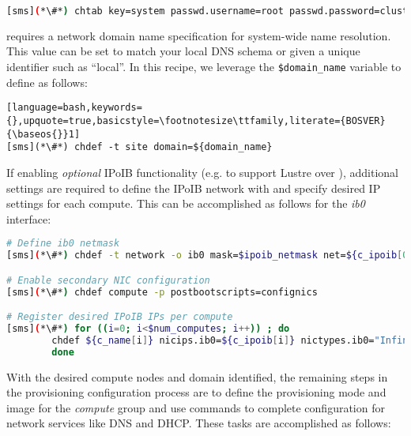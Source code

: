 \begin{lstlisting}[language=bash,keywords={},upquote=true,basicstyle=\footnotesize\ttfamily,]
[sms](*\#*) chtab key=system passwd.username=root passwd.password=cluster
\end{lstlisting}
\noindent \xCAT{} requires a network domain name specification for system-wide name
resolution. This value can be set to match your local DNS schema or given a
unique identifier such as ``local''. In this recipe, we leverage the
\texttt{\$domain\_name} variable to define as follows:

\begin{lstlisting}[language=bash,keywords={},upquote=true,basicstyle=\footnotesize\ttfamily,literate={BOSVER}{\baseos{}}1]
[sms](*\#*) chdef -t site domain=${domain_name}
\end{lstlisting}

If enabling {\em optional} IPoIB functionality (e.g. to support Lustre over \InfiniBand{}), additional
settings are required to define the IPoIB network with \xCAT{} and specify
desired IP settings for each compute. This can be accomplished as follows for
the {\em ib0} interface:

\begin{lstlisting}[language=bash,keywords={},upquote=true,basicstyle=\footnotesize\ttfamily]
# Define ib0 netmask
[sms](*\#*) chdef -t network -o ib0 mask=$ipoib_netmask net=${c_ipoib[0]}

# Enable secondary NIC configuration
[sms](*\#*) chdef compute -p postbootscripts=confignics

# Register desired IPoIB IPs per compute
[sms](*\#*) for ((i=0; i<$num_computes; i++)) ; do
		chdef ${c_name[i]} nicips.ib0=${c_ipoib[i]} nictypes.ib0="InfiniBand" nicnetworks.ib0=ib0
        done
\end{lstlisting}

With the desired compute nodes and domain identified, the remaining steps in the
provisioning configuration process are to define the provisioning mode and
image for the {\em compute} group and use \xCAT{} commands to complete
configuration for network services like DNS and DHCP. These tasks are
accomplished as follows:

